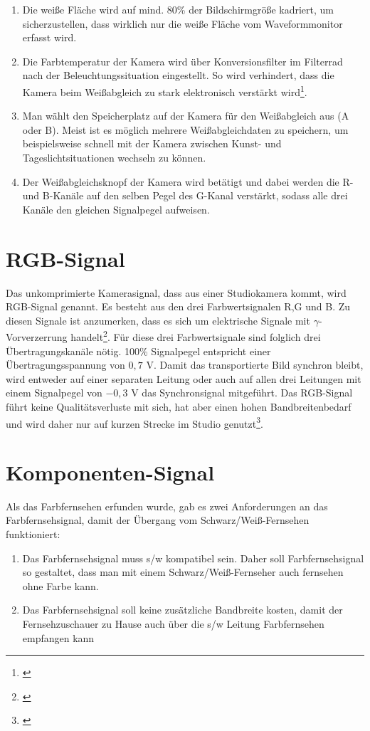 \begin{enumerate}
\item Die weiße Fläche wird auf mind. 80\% der Bildschirmgröße kadriert, um sicherzustellen, dass wirklich nur die weiße Fläche vom Waveformmonitor erfasst wird.
\item Die Farbtemperatur der Kamera wird über Konversionsfilter im Filterrad nach der Beleuchtungssituation eingestellt. So wird verhindert, dass die Kamera beim Weißabgleich zu stark elektronisch verstärkt wird\footnote{\cite[415]{schmidt}}.
\item Man wählt den Speicherplatz auf der Kamera für den Weißabgleich aus (A oder B). Meist ist es möglich mehrere Weißabgleichdaten zu speichern, um beispielsweise schnell mit der Kamera zwischen Kunst- und Tageslichtsituationen wechseln zu können.
\item Der Weißabgleichsknopf der Kamera wird betätigt und dabei werden die R- und B-Kanäle auf den selben Pegel des G-Kanal verstärkt, sodass alle drei Kanäle den gleichen Signalpegel aufweisen.
\end{enumerate}
  

\section{RGB-Signal}
\label{sec_rgbsignal}
Das unkomprimierte Kamerasignal, dass aus einer Studiokamera kommt, wird RGB-Signal genannt. Es besteht aus den drei Farbwertsignalen R,G und B. Zu diesen Signale ist anzumerken, dass es sich um elektrische Signale mit $\gamma$-Vorverzerrung handelt\footnote{\cite[82]{schmidt}}. Für diese drei Farbwertsignale sind folglich drei Übertragungskanäle nötig. 100\% Signalpegel entspricht einer Übertragungsspannung von $0,7$ V. Damit das transportierte Bild synchron bleibt, wird entweder auf einer separaten Leitung oder auch auf allen drei Leitungen mit einem Signalpegel von $-0,3$ V das Synchronsignal mitgeführt. Das RGB-Signal führt keine Qualitätsverluste mit sich, hat aber einen hohen Bandbreitenbedarf und wird daher nur auf kurzen Strecke im Studio genutzt\footnote{\cite[83]{schmidt}}.

\section{Komponenten-Signal}
\label{sec_ycrcb}
Als das Farbfernsehen erfunden wurde, gab es zwei Anforderungen an das Farbfernsehsignal, damit der Übergang vom Schwarz/Weiß-Fernsehen funktioniert: 
\begin{enumerate}
\item Das Farbfernsehsignal muss s/w kompatibel sein. Daher soll Farbfernsehsignal so gestaltet, dass man mit einem Schwarz/Weiß-Fernseher auch fernsehen ohne Farbe kann.
\item Das Farbfernsehsignal soll keine zusätzliche Bandbreite kosten, damit der Fernsehzuschauer zu Hause auch über die s/w Leitung Farbfernsehen empfangen kann
\end{enumerate}

